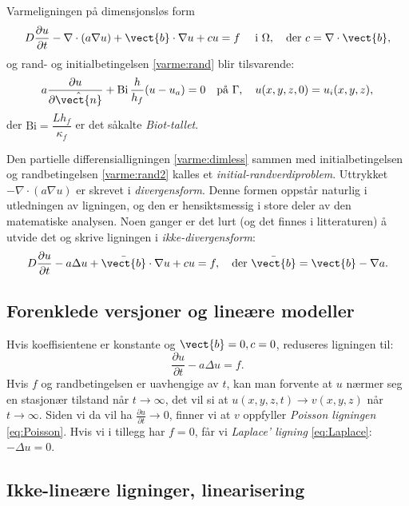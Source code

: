 \begin{oppsum}{Varmeligningen på dimensjonsløs form}
\begin{align}\label{varme:dimless}
D\frac{\partial u}{\partial t} - \nabla \cdot (a\nabla u)+\vect{b}\cdot \nabla u +cu=f \quad \text{ i } \Omega, \quad \text{der } c=\nabla \cdot \vect{b},
\end{align}
og rand- og initialbetingelsen \eqref{varme:rand} blir tilsvarende:
\begin{align}\label{varme:rand2}
a \frac{\partial u}{\partial \hat{\vect{n}}} + \mathrm{Bi}\,\frac{h}{h_f}(u - u_a) = 0 \quad \text{på } \Gamma, \quad u(x,y,z, 0) = u_i(x,y,z),
\end{align}
der \( \mathrm{Bi} = \dfrac{L h_f}{\kappa_f} \) er det såkalte \emph{Biot-tallet}.
\end{oppsum}

Den partielle differensialligningen \eqref{varme:dimless} sammen med initialbetingelsen og randbetingelsen \eqref{varme:rand2} kalles et \emph{initial-randverdiproblem}. Uttrykket \( -\nabla \cdot (a \nabla u) \) er skrevet i \emph{divergensform}. Denne formen oppstår naturlig i utledningen av ligningen, og den er hensiktsmessig i store deler av den matematiske analysen. Noen ganger er det lurt (og det finnes i litteraturen) å utvide det og skrive ligningen i \emph{ikke-divergensform}:
\[
D \frac{\partial u}{\partial t} - a \Delta u + \bar{\vect{b}} \cdot \nabla u + c u = f, \quad \text{der } \bar{\vect{b}} = \vect{b} - \nabla a.
\]

\subsection*{Forenklede versjoner og lineære modeller}
Hvis koeffisientene er konstante og \( \vect{b} = 0, c = 0 \), reduseres ligningen til:
\[
\frac{\partial u}{\partial t} - a \Delta u = f.
\]
Hvis \( f \) og randbetingelsen er uavhengige av \( t \), kan man forvente at \( u \) nærmer seg en stasjonær tilstand når \( t \to \infty \), det vil si at \( u(x,y,z, t) \to v(x,y,z) \) når \( t \to \infty \).  
Siden vi da vil ha \( \frac{\partial u}{\partial t} \to 0 \), finner vi at \( v \) oppfyller \emph{Poisson ligningen} \eqref{eq:Poisson}.  
Hvis vi i tillegg har \( f = 0 \), får vi \emph{Laplace' ligning} \eqref{eq:Laplace}: $-\Delta u=0$.

\subsection*{Ikke-lineære ligninger, linearisering}

